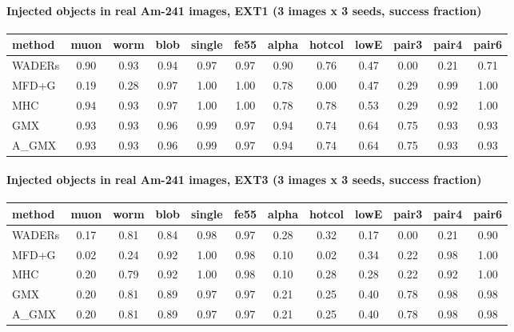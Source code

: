 \paragraph{Injected objects in real Am-241 images, EXT1 (3 images x 3 seeds, success fraction)}
\begin{table}[H]\centering\footnotesize
\begin{adjustbox}{max width=\linewidth}
\begin{tabular}{lccccccccccc}
\toprule
method & muon & worm & blob & single & fe55 & alpha & hotcol & lowE & pair3 & pair4 & pair6 \\
\midrule
WADERs & 0.90 & 0.93 & 0.94 & 0.97 & 0.97 & 0.90 & 0.76 & 0.47 & 0.00 & 0.21 & 0.71 \\
MFD+G & 0.19 & 0.28 & 0.97 & 1.00 & 1.00 & 0.78 & 0.00 & 0.47 & 0.29 & 0.99 & 1.00 \\
MHC & 0.94 & 0.93 & 0.97 & 1.00 & 1.00 & 0.78 & 0.78 & 0.53 & 0.29 & 0.92 & 1.00 \\
GMX & 0.93 & 0.93 & 0.96 & 0.99 & 0.97 & 0.94 & 0.74 & 0.64 & 0.75 & 0.93 & 0.93 \\
A\_GMX & 0.93 & 0.93 & 0.96 & 0.99 & 0.97 & 0.94 & 0.74 & 0.64 & 0.75 & 0.93 & 0.93 \\
\bottomrule
\end{tabular}
\end{adjustbox}
\end{table}

\paragraph{Injected objects in real Am-241 images, EXT3 (3 images x 3 seeds, success fraction)}
\begin{table}[H]\centering\footnotesize
\begin{adjustbox}{max width=\linewidth}
\begin{tabular}{lccccccccccc}
\toprule
method & muon & worm & blob & single & fe55 & alpha & hotcol & lowE & pair3 & pair4 & pair6 \\
\midrule
WADERs & 0.17 & 0.81 & 0.84 & 0.98 & 0.97 & 0.28 & 0.32 & 0.17 & 0.00 & 0.21 & 0.90 \\
MFD+G & 0.02 & 0.24 & 0.92 & 1.00 & 0.98 & 0.10 & 0.02 & 0.34 & 0.22 & 0.98 & 1.00 \\
MHC & 0.20 & 0.79 & 0.92 & 1.00 & 0.98 & 0.10 & 0.28 & 0.28 & 0.22 & 0.92 & 1.00 \\
GMX & 0.20 & 0.81 & 0.89 & 0.97 & 0.97 & 0.21 & 0.25 & 0.40 & 0.78 & 0.98 & 0.98 \\
A\_GMX & 0.20 & 0.81 & 0.89 & 0.97 & 0.97 & 0.21 & 0.25 & 0.40 & 0.78 & 0.98 & 0.98 \\
\bottomrule
\end{tabular}
\end{adjustbox}
\end{table}

